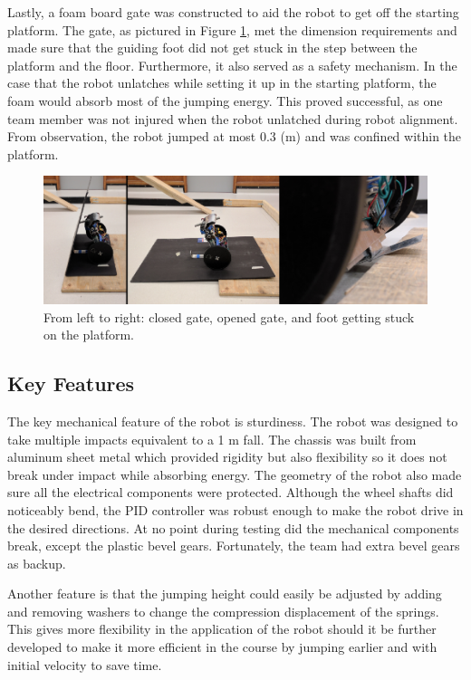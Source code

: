 \documentclass[ece]{uw-wkrpt}
\begin{document}
Lastly, a foam board gate was constructed to aid the robot to get off the starting platform. The gate, as pictured in Figure \ref{fig:mech12}, met the dimension requirements and made sure that the guiding foot did not get stuck in the step between the platform and the floor. Furthermore, it also served as a safety mechanism. In the case that the robot unlatches while setting it up in the starting platform, the foam would absorb most of the jumping energy. This proved successful, as one team member was not injured when the robot unlatched during robot alignment. From observation, the robot jumped at most 0.3 (m) and was confined within the platform.

\begin{figure}
    \centering
    \includegraphics[width=5.5in]{res/mech12}
    \caption[Launch platform]
          {From left to right: closed gate, opened gate, and foot getting stuck on the platform.}
    \label{fig:mech12}
\end{figure}

\subsection{Key Features}

The key mechanical feature of the robot is sturdiness. The robot was designed to take multiple impacts equivalent to a 1 m fall. The chassis was built from aluminum sheet metal which provided rigidity but also flexibility so it does not break under impact while absorbing energy. The geometry of the robot also made sure all the electrical components were protected. Although the wheel shafts did noticeably bend, the PID controller was robust enough to make the robot drive in the desired directions. At no point during testing did the mechanical components break, except the plastic bevel gears. Fortunately, the team had extra bevel gears as backup.

Another feature is that the jumping height could easily be adjusted by adding and removing washers to change the compression displacement of the springs. This gives more flexibility in the application of the robot should it be further developed to make it more efficient in the course by jumping earlier and with initial velocity to save time.
\end{document}
